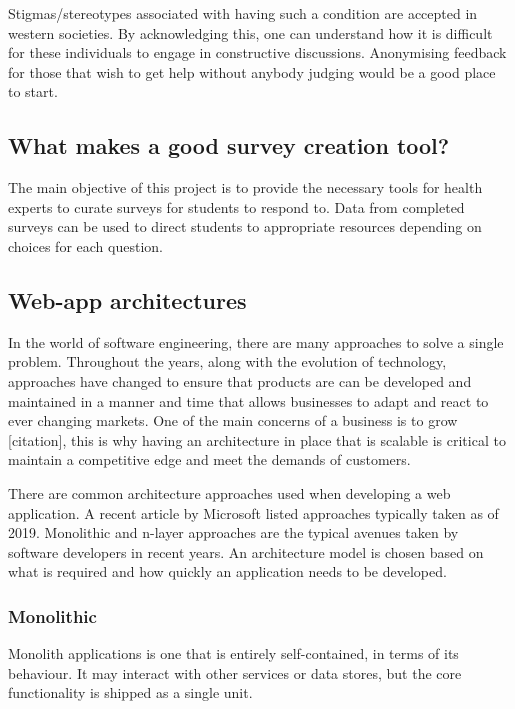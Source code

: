 Stigmas/stereotypes associated with having such a condition are accepted in western societies\cite{corrigan2002paradox}.
By acknowledging this, one can understand how it is difficult for these individuals to engage in constructive discussions.
Anonymising feedback for those that wish to get help without anybody judging would be a good place to start. 

\subsection{What makes a good survey creation tool?}

The main objective of this project is to provide the necessary tools for health experts to curate surveys for students to respond to.
Data from completed surveys can be used to direct students to appropriate resources depending on choices for each question.


\subsection{Web-app architectures}
In the world of software engineering, there are many approaches to solve a single problem.
Throughout the years, along with the evolution of technology, approaches have changed to ensure that products are
can be developed and maintained in a manner and time that allows businesses to adapt and react to ever changing markets. 
One of the main concerns of a business is to grow [citation], this is why having an architecture in place that is scalable is
critical to maintain a competitive edge and meet the demands of customers.

There are common architecture approaches used when developing a web application.
A recent article by Microsoft listed approaches typically taken as of 2019. 
Monolithic and n-layer approaches are the typical avenues taken by software developers in recent years\cite{ardalis_common}.
An architecture model is chosen based on what is required and how quickly an application needs to be developed.

\subsubsection{Monolithic}
Monolith applications is one that is entirely self-contained, in terms of its behaviour\cite{ardalis_common}.
It may interact with other services or data stores, but the core functionality is shipped as a single unit.

